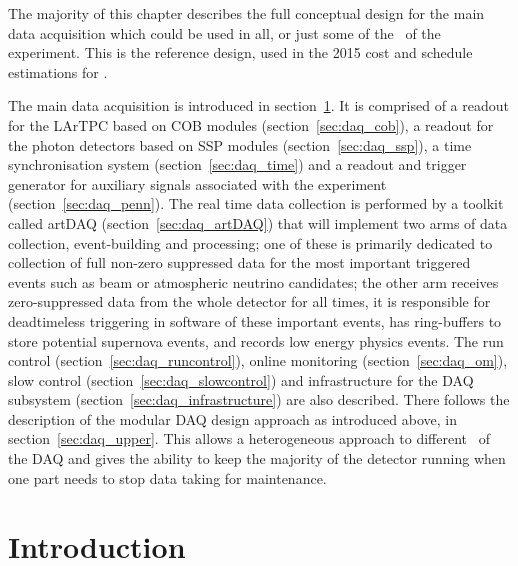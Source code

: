 The majority of this chapter describes the full conceptual design for
the main data acquisition which could be used in all, or just some of
the \COMPARTMENTS\ of the experiment.  This is the reference design,
used in the 2015 cost and schedule estimations for \LBNE.  


The main data acquisition is introduced in
section~\ref{sec:daq_intro}.  It is comprised of a readout for the
LArTPC based on COB modules (section~\ref{sec:daq_cob}), a readout for
the photon detectors based on SSP modules (section~\ref{sec:daq_ssp}),
a time synchronisation system (section~\ref{sec:daq_time}) and a
readout and trigger generator for auxiliary signals associated with
the experiment (section~\ref{sec:daq_penn}).  The real time data
collection is performed by a toolkit called artDAQ
(section~\ref{sec:daq_artDAQ}) that will implement two arms of data
collection, event-building and processing; 
one of these is primarily dedicated to collection of full non-zero
suppressed data for the most important triggered events such as beam
or atmospheric neutrino candidates;  the other arm receives
zero-suppressed data from the whole detector for all times, it is responsible for
deadtimeless triggering in software of these important events, has ring-buffers to
store potential supernova events, and records low energy physics events.
The run control
(section~\ref{sec:daq_runcontrol}), online monitoring
(section~\ref{sec:daq_om}), slow control
(section~\ref{sec:daq_slowcontrol}) and infrastructure for the DAQ
subsystem (section~\ref{sec:daq_infrastructure}) are also described.
There follows the description of the modular DAQ design approach
as introduced above, in section~\ref{sec:daq_upper}.  This allows a
heterogeneous approach to different \COMPARTMENTS\ of the DAQ and
gives the ability to keep the majority of the detector running when
one part needs to stop data taking for maintenance.

\section{Introduction}
\label{sec:daq_intro}

